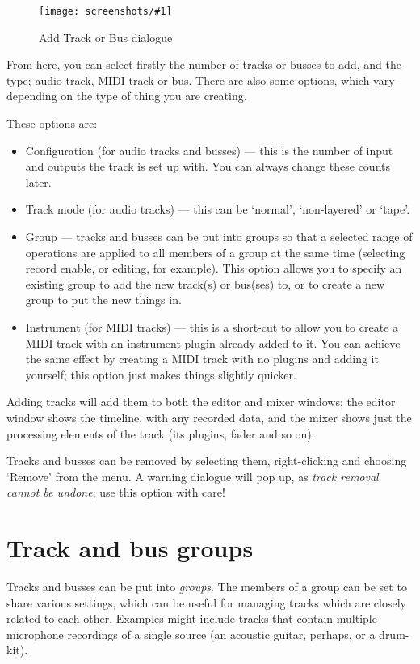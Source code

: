 \documentclass[10pt,a4paper]{book}
\newcommand{\todo}[1]{\marginpar{\small\texttt{#1}}}
\newcommand{\screenshot}[3]{%
\begin{figure}[ht]%
\begin{center}
\texttt{[image: screenshots/\#1]}
\end{center}
\caption{#2}
\label{#3}
\end{figure}}
\begin{document}
{\screenshot{add-track-or-bus.png}{Add Track or Bus dialogue}{fig:add-track-or-bus}

From here, you can select firstly the number of tracks or busses to
add, and the type; audio track, MIDI track or bus.  There are also
some options, which vary depending on the type of thing you are
creating.

These options are:
\begin{itemize}
\item Configuration (for audio tracks and busses) --- this is the
  number of input and outputs the track is set up with.  You can
  always change these counts later.
\item Track mode (for audio tracks) --- this can be `normal', `non-layered' or `tape'.
\todo{I have no idea what non-layered nor tape modes do}
\item Group --- tracks and busses can be put into groups so that a
  selected range of operations are applied to all members of a group
  at the same time (selecting record enable, or editing, for example).
  This option allows you to specify an existing group to add the new
  track(s) or bus(ses) to, or to create a new group to put the new
  things in.
\item Instrument (for MIDI tracks) --- this is a short-cut to allow
  you to create a MIDI track with an instrument plugin already added
  to it.  You can achieve the same effect by creating a MIDI track
  with no plugins and adding it yourself; this option just makes
  things slightly quicker.
\end{itemize}

Adding tracks will add them to both the editor and mixer windows; the
editor window shows the timeline, with any recorded data, and the
mixer shows just the processing elements of the track (its plugins,
fader and so on).

Tracks and busses can be removed by selecting them, right-clicking and
choosing `Remove' from the menu.  A warning dialogue will pop up, as
\emph{track removal cannot be undone}; use this option with care!


\section{Track and bus groups}
\label{sec:track-and-bus-groups}

Tracks and busses can be put into \emph{groups}. The members of a
group can be set to share various settings, which can be useful for
managing tracks which are closely related to each other.  Examples
might include tracks that contain multiple-microphone recordings of a
single source (an acoustic guitar, perhaps, or a drum-kit).

}
\end{document}
